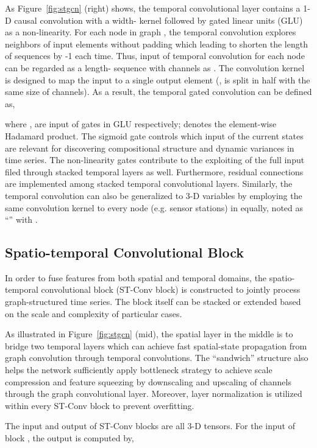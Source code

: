 \documentclass{article}
\begin{document}
As Figure~\ref{fig:stgcn} (right) shows, the temporal convolutional layer contains a 1-D causal convolution with a width- kernel followed by gated linear units (GLU) as a non-linearity. For each node in graph , the temporal convolution explores  neighbors of input elements without padding which leading to shorten the length of sequences by -1 each time. Thus, input of temporal convolution for each node can be regarded as a length- sequence with  channels as . The convolution kernel  is designed to map the input  to a single output element  (,  is split in half with the same size of channels). As a result, the temporal gated convolution can be defined as,
 
where ,  are input of gates in GLU respectively;  denotes the element-wise Hadamard product. The sigmoid gate  controls which input  of the current states are relevant for discovering compositional structure and dynamic variances in time series. The non-linearity gates contribute to the exploiting of the full input filed through stacked temporal layers as well. Furthermore, residual connections are implemented among stacked temporal convolutional layers. Similarly, the temporal convolution can also be generalized to 3-D variables by employing the same convolution kernel  to every node  (e.g. sensor stations) in  equally, noted as ``'' with .

\subsection{Spatio-temporal Convolutional Block}
In order to fuse features from both spatial and temporal domains, the spatio-temporal convolutional block (ST-Conv block) is constructed to jointly process graph-structured time series. The block itself can be stacked or extended based on the scale and complexity of particular cases. 

As illustrated in Figure~\ref{fig:stgcn} (mid), the spatial layer in the middle is to bridge two temporal layers which can achieve fast spatial-state propagation from graph convolution through temporal convolutions. The ``sandwich'' structure also helps the network sufficiently apply bottleneck strategy to achieve scale compression and feature squeezing by downscaling and upscaling of channels  through the graph convolutional layer. Moreover, layer normalization is utilized within every ST-Conv block to prevent overfitting.

The input and output of ST-Conv blocks are all 3-D tensors. For the input  of block , the output  is computed by,
\end{document}
